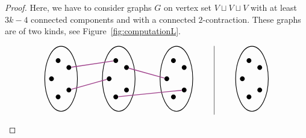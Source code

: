 \documentclass[12pt,a4paper,reqno]{amsart}
\theoremstyle{remark}
\begin{document}
\begin{proof}
Here, we have to consider graphs $G$ on vertex set $V \sqcup V \sqcup V$ with at least $3k-4$ connected components and with a connected $2$-contraction. These graphs are of two kinds, see Figure~\ref{fig:computationL}.
 \begin{figure}[ht]
 $$\begin{array}{c|c}
     \begin{tikzpicture}[scale=.8]
    \tikzstyle{vertex}=[circle,fill=black,inner sep=0pt,minimum size=2mm]
    \begin{scope}[xscale=.5]
        \node (v1) at (36:1) [vertex] {};
        \node (v2) at (108:1) [vertex] {};
        \node (v3) at (180:1) [vertex] {};
        \node (v4) at (-108:1) [vertex] {};
        \node (v5) at (-36:1) [vertex] {};
        \draw [line width=0.8pt] (0,0) circle (1.7);
    \end{scope}
    \begin{scope}[xshift= 3cm,xscale=.5]
        \node (v1b) at (36:1) [vertex] {};
        \node (v2b) at (108:1) [vertex] {};
        \node (v3b) at (180:1) [vertex] {};
        \node (v4b) at (-108:1) [vertex] {};
        \node (v5b) at (-36:1) [vertex] {};
        \draw [line width=0.8pt] (0,0) circle (1.7);
    \end{scope}
    \begin{scope}[xshift= 6cm,xscale=.5]
        \node (v1t) at (36:1) [vertex] {};
        \node (v2t) at (108:1) [vertex] {};
        \node (v3t) at (180:1) [vertex] {};
        \node (v4t) at (-108:1) [vertex] {};
        \node (v5t) at (-36:1) [vertex] {};
        \draw [line width=0.8pt] (0,0) circle (1.7);
    \end{scope}
    \draw [line width=1pt,DarkOrchid] (v1) to (v2b);
    \draw [line width=1pt,DarkOrchid] (v5) to (v3b);
    \draw [line width=1pt,DarkOrchid] (v1b) to (v3t);
    \draw [line width=1pt,DarkOrchid] (v4b) to (v5t);
\end{tikzpicture}
\qquad & \qquad
     \begin{tikzpicture}[scale=.8]
    \tikzstyle{vertex}=[circle,fill=black,inner sep=0pt,minimum size=2mm]
    \begin{scope}[xscale=.5]
        \node (v1) at (36:1) [vertex] {};
        \node (v2) at (108:1) [vertex] {};
        \node (v3) at (180:1) [vertex] {};
        \node (v4) at (-108:1) [vertex] {};
        \node (v5) at (-36:1) [vertex] {};
        \draw [line width=0.8pt] (0,0) circle (1.7);
    \end{scope}
    \begin{scope}[xshift= 3cm,xscale=.5]

\end{scope}
\end{tikzpicture}
\end{array}$$
\end{figure}
\end{proof}
\end{document}

